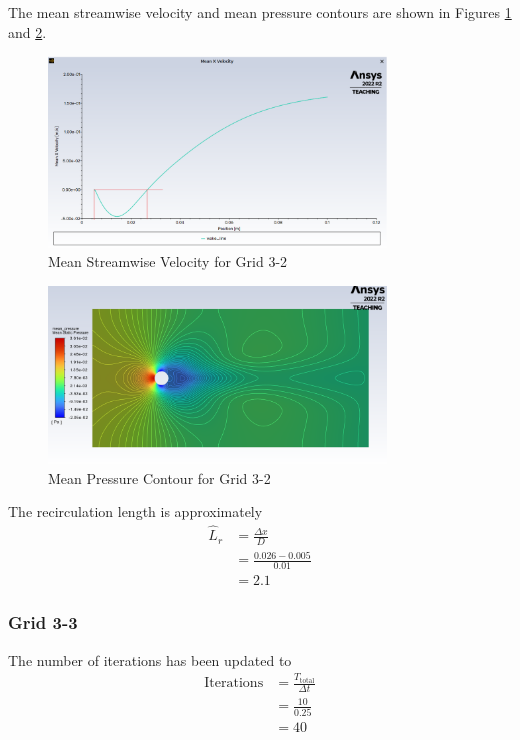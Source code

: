 The mean streamwise velocity and mean pressure contours are shown in Figures \ref{fig:mean x velocity along wake center line grid 3 2} and \ref{fig:mean pressure velocity contour grid 3 2}.
\begin{figure}[H]
    \centering
    \includegraphics[width=0.8\textwidth]{Questions/Figures/mean x velocity along wake center line grid 3 2.png}
    \caption{Mean Streamwise Velocity for Grid 3-2}
    \label{fig:mean x velocity along wake center line grid 3 2}
\end{figure}
\begin{figure}[H]
    \centering
    \includegraphics[width=0.8\textwidth]{Questions/Figures/mean pressure velocity contour grid 3 2.png}
    \caption{Mean Pressure Contour for Grid 3-2}
    \label{fig:mean pressure velocity contour grid 3 2}
\end{figure}
The recirculation length is approximately
\begin{align*}
    \hat{L}_r &= \frac{\Delta x}{D} \\
    &= \frac{0.026 - 0.005}{0.01} \\
    &= \boxed{2.1}
\end{align*}

\subsubsection{Grid 3-3}
The number of iterations has been updated to
\begin{align*}
    \text{Iterations} &= \frac{T_{\text{total}}}{\Delta t} \\
    &= \frac{10}{0.25} \\
    &= \boxed{40}
\end{align*}

